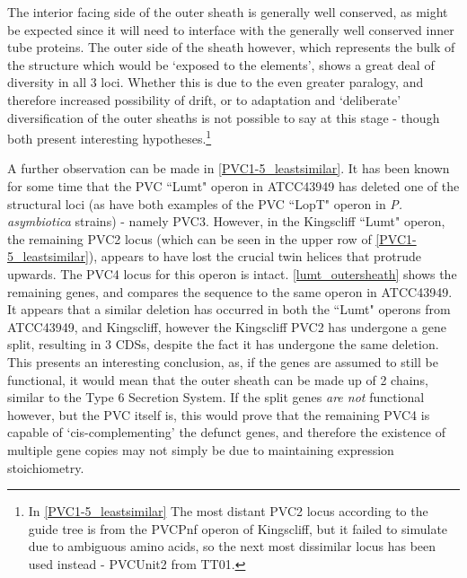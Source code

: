 The interior facing side of the outer sheath is generally well conserved, as might be expected since it will need to interface with the generally well conserved inner tube proteins. The outer side of the sheath however, which represents the bulk of the structure which would be `exposed to the elements', shows a great deal of diversity in all 3 loci. Whether this is due to the even greater paralogy, and therefore increased possibility of drift, or to adaptation and `deliberate' diversification of the outer sheaths is not possible to say at this stage - though both present interesting hypotheses.\footnote{In \vref{PVC1-5_leastsimilar} The most distant PVC2 locus according to the guide tree is from the PVCPnf operon of \Pasy{} Kingscliff, but it failed to simulate due to ambiguous amino acids, so the next most dissimilar locus has been used instead - PVCUnit2 from \Plum{} TT01.}

A further observation can be made in \vref{PVC1-5_leastsimilar}. It has been known for some time that the PVC ``Lumt" operon in \Pasy{} ATCC43949 has deleted one of the structural loci (as have both examples of the PVC ``LopT" operon in \emph{P. asymbiotica} strains) - namely PVC3. However, in the Kingscliff ``Lumt" operon, the remaining PVC2 locus (which can be seen in the upper row of \vref{PVC1-5_leastsimilar}), appears to have lost the crucial twin helices that protrude upwards. The PVC4 locus for this operon is intact. \vref{lumt_outersheath} shows the remaining genes, and compares the sequence to the same operon in \Pasy{} ATCC43949. It appears that a similar deletion has occurred in both the ``Lumt" operons from \Pasy{} ATCC43949, and Kingscliff, however the Kingscliff PVC2 has undergone a gene split, resulting in 3 CDSs, despite the fact it has undergone the same deletion. This presents an interesting conclusion, as, if the genes are assumed to still be functional, it would mean that the outer sheath can be made up of 2 chains, similar to the Type 6 Secretion System. If the split genes \emph{are not} functional however, but the PVC itself is, this would prove that the remaining PVC4 is capable of `cis-complementing' the defunct genes, and therefore the existence of multiple gene copies may not simply be due to maintaining expression stoichiometry.


